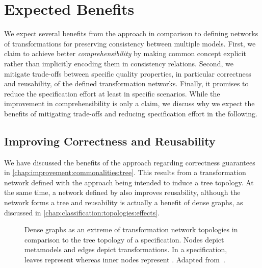 \section{Expected Benefits}
\label{chap:improvement:benefits}

We expect several benefits from the \commonalities approach in comparison to defining networks of transformations for preserving consistency between multiple models.
First, we claim to achieve better \emph{comprehensibility} by making common concept explicit rather than implicitly encoding them in consistency relations.
Second, we mitigate trade-offs between specific quality properties, in particular correctness and reusability, of the defined transformation networks.
Finally, it promises to reduce the specification effort at least in specific scenarios.
While the improvement in comprehensibility is only a claim, we discuss why we expect the benefits of mitigating trade-offs and reducing specification effort in the following.


\subsection{Improving Correctness and Reusability}
\label{chap:improvement:benefits:properties}

We have discussed the benefits of the \commonalities approach regarding correctness guarantees in \autoref{chap:improvement:commonalities:tree}.
This results from a transformation network defined with the \commonalities approach being intended to induce a tree topology.
At the same time, a network defined by \commonalities also improves reusability, although the network forms a tree and reusability is actually a benefit of dense graphs, as discussed in \autoref{chap:classification:topologies:effects}.

\begin{figure}
    \centering
    \begin{minipage}[b]{0.49\columnwidth}
        \centering
        
        \label{fig:improvement:topologies:complete}
    \end{minipage}
    \hfill
    \begin{minipage}[b]{0.49\columnwidth}
        \centering
        
        \vspace{1em}
        \label{fig:improvement:topologies:tree}
    \end{minipage}
    \caption[Benefit of \commonalities regarding quality trade-offs]{Dense graphs as an extreme of transformation network topologies in comparison to the tree topology of a \commonalities specification. Nodes depict metamodels and edges depict transformations. In a \commonalities specification, leaves represent \concretemetamodels whereas inner nodes represent \conceptmetamodels. Adapted from~.}
    \label{fig:improvement:topologies}
\end{figure}

